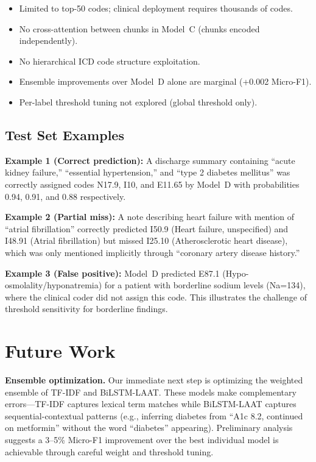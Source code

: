 \documentclass[11pt,a4paper]{article}
\begin{document}
\begin{itemize}[nosep,leftmargin=1.5em]
    \item Limited to top-50 codes; clinical deployment requires thousands of codes.
    \item No cross-attention between chunks in Model~C (chunks encoded independently).
    \item No hierarchical ICD code structure exploitation.
    \item Ensemble improvements over Model~D alone are marginal (+0.002 Micro-F1).
    \item Per-label threshold tuning not explored (global threshold only).
\end{itemize}

\subsection{Test Set Examples}

\textbf{Example 1 (Correct prediction):} A discharge summary containing ``acute kidney failure,'' ``essential hypertension,'' and ``type 2 diabetes mellitus'' was correctly assigned codes N17.9, I10, and E11.65 by Model~D with probabilities 0.94, 0.91, and 0.88 respectively.

\textbf{Example 2 (Partial miss):} A note describing heart failure with mention of ``atrial fibrillation'' correctly predicted I50.9 (Heart failure, unspecified) and I48.91 (Atrial fibrillation) but missed I25.10 (Atherosclerotic heart disease), which was only mentioned implicitly through ``coronary artery disease history.''

\textbf{Example 3 (False positive):} Model~D predicted E87.1 (Hypo-osmolality/hyponatremia) for a patient with borderline sodium levels (Na=134), where the clinical coder did not assign this code. This illustrates the challenge of threshold sensitivity for borderline findings.

\section{Future Work}

\textbf{Ensemble optimization.} Our immediate next step is optimizing the weighted ensemble of TF-IDF and BiLSTM-LAAT. These models make complementary errors---TF-IDF captures lexical term matches while BiLSTM-LAAT captures sequential-contextual patterns (e.g., inferring diabetes from ``A1c 8.2, continued on metformin'' without the word ``diabetes'' appearing). Preliminary analysis suggests a 3--5\% Micro-F1 improvement over the best individual model is achievable through careful weight and threshold tuning.
\end{document}
